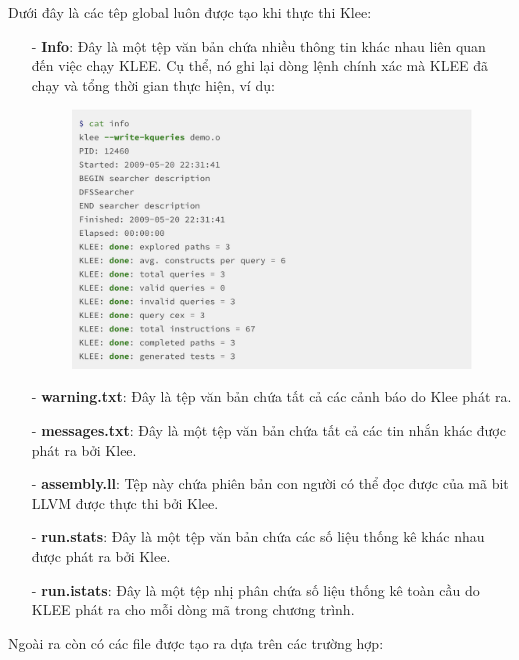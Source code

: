 \documentclass[12pt,a4paper]{article}
\begin{document}
Dưới đây là các têp global luôn được tạo khi thực thi Klee:

\begin{itemize}
\item[-] \textbf{Info}: Đây là một tệp văn bản chứa nhiều thông tin khác nhau liên quan đến việc chạy KLEE. Cụ thể, nó ghi lại dòng lệnh chính xác mà KLEE đã chạy và tổng thời gian thực hiện, ví dụ:

\begin{figure}[ht]
\begin{center}
\includegraphics[scale=.3]{hinhanh/fileinfo.png}
\end{center}
\end{figure}

\item[-] \textbf{warning.txt}: Đây là tệp văn bản chứa tất cả các cảnh báo do Klee phát ra.
\item[-] \textbf{messages.txt}: Đây là một tệp văn bản chứa tất cả các tin nhắn khác được phát ra bởi Klee.
\item[-] \textbf{assembly.ll}: Tệp này chứa phiên bản con người có thể đọc được của mã bit LLVM được thực thi bởi Klee. 
\item[-] \textbf{run.stats}: Đây là một tệp văn bản chứa các số liệu thống kê khác nhau được phát ra bởi Klee.
\item[-] \textbf{run.istats}: Đây là một tệp nhị phân chứa số liệu thống kê toàn cầu do KLEE phát ra cho mỗi dòng mã trong chương trình.
\end{itemize}

Ngoài ra còn có các file được tạo ra dựa trên các trường hợp:
\end{document}
